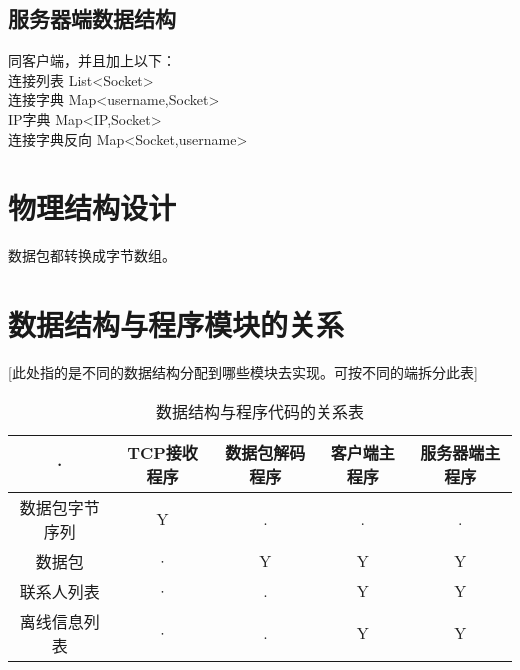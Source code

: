 \subsection{服务器端数据结构}
	同客户端，并且加上以下：\\
	连接列表 List<Socket> \\
	连接字典 Map<username,Socket>\\
	IP字典  Map<IP,Socket>\\
	连接字典反向 Map<Socket,username>
\section{物理结构设计}
	数据包都转换成字节数组。

\section{数据结构与程序模块的关系}
[此处指的是不同的数据结构分配到哪些模块去实现。可按不同的端拆分此表]
\begin{table}[htbp]
\centering
\caption{数据结构与程序代码的关系表} \label{tab:datastructure-module}
\begin{tabular}{|c|c|c|c|c}
    \hline
    · & TCP接收程序 & 数据包解码程序 & 客户端主程序 & 服务器端主程序\\
    \hline
    数据包字节序列 & Y & . & . & .\\
    \hline
    数据包 & · & Y & Y & Y \\
    \hline
    联系人列表 & · & . & Y & Y\\
    \hline
    离线信息列表 & · & . & Y & Y \\
    \hline
\end{tabular}
\end{table}